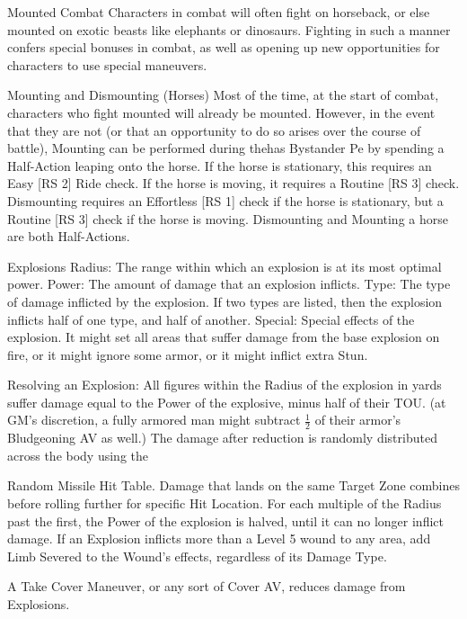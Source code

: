 \documentclass[oneside,11pt,english]{book}
\begin{document}
 

Mounted Combat 
Characters in combat will often fight on horseback, or else mounted on exotic beasts like elephants or 
dinosaurs. Fighting in such a manner confers special bonuses in combat, as well as opening up new 
opportunities for characters to use special maneuvers. 

 

Mounting and Dismounting (Horses) 
Most of the time, at the start of combat, characters who fight mounted will already be mounted. However, 
in the event that they are not (or that an opportunity to do so arises over the course of battle), Mounting 
can be performed during thehas Bystander Pe by spending a Half-Action leaping onto the horse. If the 
horse is stationary, this requires an Easy [RS 2] Ride check. If the horse is moving, it requires a Routine 
[RS 3] check. 
Dismounting requires an Effortless [RS 1] check if the horse is stationary, but a Routine [RS 3] check if 
the horse is moving. 
Dismounting and Mounting a horse are both Half-Actions. 

 

Explosions 
Radius: The range within which an explosion is at its most optimal power. 
Power: The amount of damage that an explosion inflicts. 
Type: The type of damage inflicted by the explosion. If two types are listed, then the explosion inflicts 
half of one type, and half of another. 
Special: Special effects of the explosion. It might set all areas that suffer damage from the base explosion 
on fire, or it might ignore some armor, or it might inflict extra Stun. 

 

Resolving an Explosion: 
All figures within the Radius of the explosion in yards suffer damage equal to the Power of the explosive, 
minus half of their TOU. (at GM's discretion, a fully armored man might subtract $ \frac{1}{2} $ of their armor's 
Bludgeoning AV as well.) The damage after reduction is randomly distributed across the body using the 


Random Missile Hit Table. Damage that lands on the same Target Zone combines before rolling further 
for specific Hit Location. 
For each multiple of the Radius past the first, the Power of the explosion is halved, until it can no longer 
inflict damage. 
If an Explosion inflicts more than a Level 5 wound to any area, add Limb Severed to the Wound's effects, 
regardless of its Damage Type. 

 

A Take Cover Maneuver, or any sort of Cover AV, reduces damage from Explosions. 
\end{document}
